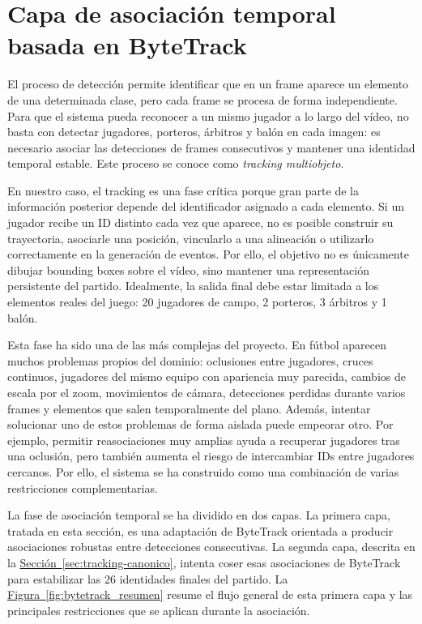 \section{Capa de asociación temporal basada en ByteTrack}
\label{sec:bytetrack-layer}

El proceso de detección permite identificar que en un frame aparece un elemento de una determinada clase, pero cada frame se procesa de forma independiente. Para que el sistema pueda reconocer a un mismo jugador a lo largo del vídeo, no basta con detectar jugadores, porteros, árbitros y balón en cada imagen: es necesario asociar las detecciones de frames consecutivos y mantener una identidad temporal estable. Este proceso se conoce como \textit{tracking multiobjeto}.

En nuestro caso, el tracking es una fase crítica porque gran parte de la información posterior depende del identificador asignado a cada elemento. Si un jugador recibe un ID distinto cada vez que aparece, no es posible construir su trayectoria, asociarle una posición, vincularlo a una alineación o utilizarlo correctamente en la generación de eventos. Por ello, el objetivo no es únicamente dibujar bounding boxes sobre el vídeo, sino mantener una representación persistente del partido. Idealmente, la salida final debe estar limitada a los elementos reales del juego: 20 jugadores de campo, 2 porteros, 3 árbitros y 1 balón.

Esta fase ha sido una de las más complejas del proyecto. En fútbol aparecen muchos problemas propios del dominio: oclusiones entre jugadores, cruces continuos, jugadores del mismo equipo con apariencia muy parecida, cambios de escala por el zoom, movimientos de cámara, detecciones perdidas durante varios frames y elementos que salen temporalmente del plano. Además, intentar solucionar uno de estos problemas de forma aislada puede empeorar otro. Por ejemplo, permitir reasociaciones muy amplias ayuda a recuperar jugadores tras una oclusión, pero también aumenta el riesgo de intercambiar IDs entre jugadores cercanos. Por ello, el sistema se ha construido como una combinación de varias restricciones complementarias.

La fase de asociación temporal se ha dividido en dos capas. La primera capa, tratada en esta sección, es una adaptación de ByteTrack orientada a producir asociaciones robustas entre detecciones consecutivas. La segunda capa, descrita en la \hyperref[sec:tracking-canonico]{Sección~\ref*{sec:tracking-canonico}}, intenta coser esas asociaciones de ByteTrack para estabilizar las 26 identidades finales del partido. La \hyperref[fig:bytetrack_resumen]{Figura~\ref*{fig:bytetrack_resumen}} resume el flujo general de esta primera capa y las principales restricciones que se aplican durante la asociación.

